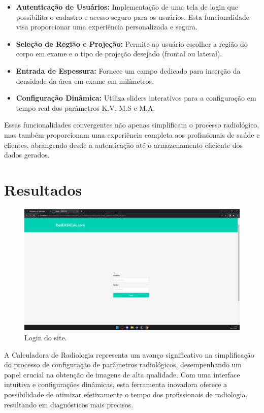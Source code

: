 \documentclass[conference]{IEEEtran}
\begin{document}
\begin{itemize}
\item \textbf{Autenticação de Usuários:} Implementação de uma tela de login que possibilita o cadastro e acesso seguro para os usuários. Esta funcionalidade visa proporcionar uma experiência personalizada e segura.
\item \textbf{Seleção de Região e Projeção:} Permite ao usuário escolher a região do corpo em exame e o tipo de projeção desejado (frontal ou lateral).
\item \textbf{Entrada de Espessura:} Fornece um campo dedicado para inserção da densidade da área em exame em milímetros.
\item \textbf{Configuração Dinâmica:} Utiliza sliders interativos para a configuração em tempo real dos parâmetros K.V, M.S e M.A.
\end{itemize}

Essas funcionalidades convergentes não apenas simplificam o processo radiológico, mas também proporcionam uma experiência completa aos profissionais de saúde e clientes, abrangendo desde a autenticação até o armazenamento eficiente dos dados gerados.

\section{Resultados}
\begin{figure}[h]
  \centering
  \includegraphics[width=0.9\columnwidth]{login.png}
  \caption{Login do site.}
  \label{fig:login}
\end{figure}

A Calculadora de Radiologia representa um avanço significativo na simplificação do processo de configuração de parâmetros radiológicos, desempenhando um papel crucial na obtenção de imagens de alta qualidade. Com uma interface intuitiva e configurações dinâmicas, esta ferramenta inovadora oferece a possibilidade de otimizar efetivamente o tempo dos profissionais de radiologia, resultando em diagnósticos mais precisos.
\end{document}
